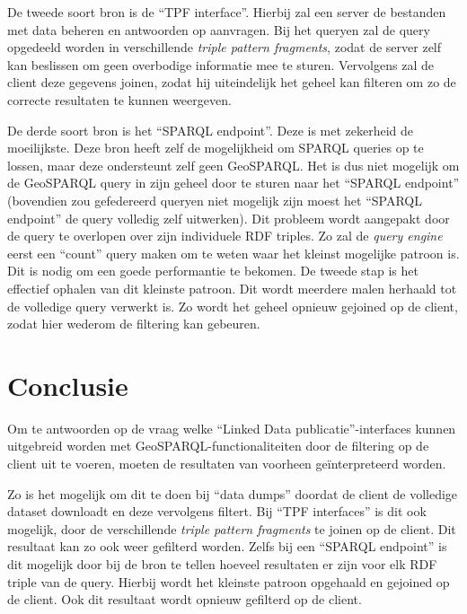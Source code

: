 \documentclass[twocolumn]{phdsymp} %
\begin{document}
De tweede soort bron is de ``TPF interface''. Hierbij zal een server de bestanden met data beheren en antwoorden op aanvragen. Bij het queryen zal de query opgedeeld worden in verschillende \textit{triple pattern fragments}, zodat de server zelf kan beslissen om geen overbodige informatie mee te sturen. Vervolgens zal de client deze gegevens joinen, zodat hij uiteindelijk het geheel kan filteren om zo de correcte resultaten te kunnen weergeven.

De derde soort bron is het ``SPARQL endpoint''. Deze is met zekerheid de moeilijkste. Deze bron heeft zelf de mogelijkheid om SPARQL queries op te lossen, maar deze ondersteunt zelf geen GeoSPARQL. Het is dus niet mogelijk om de GeoSPARQL query in zijn geheel door te sturen naar het ``SPARQL endpoint'' (bovendien zou gefedereerd queryen niet mogelijk zijn moest het ``SPARQL endpoint'' de query volledig zelf uitwerken). Dit probleem wordt aangepakt door de query te overlopen over zijn individuele RDF triples. Zo zal de \textit{query engine} eerst een ``count'' query maken om te weten waar het kleinst mogelijke patroon is. Dit is nodig om een goede performantie te bekomen. De tweede stap is het effectief ophalen van dit kleinste patroon. Dit wordt meerdere malen herhaald tot de volledige query verwerkt is. Zo wordt het geheel opnieuw gejoined op de client, zodat hier wederom de filtering kan gebeuren.

\section{Conclusie}
Om te antwoorden op de vraag welke ``Linked Data publicatie''-interfaces kunnen uitgebreid worden met GeoSPARQL-functionaliteiten door de filtering op de client uit te voeren, moeten de resultaten van voorheen geïnterpreteerd worden. 

Zo is het mogelijk om dit te doen bij ``data dumps'' doordat de client de volledige dataset downloadt en deze vervolgens filtert. Bij ``TPF interfaces'' is dit ook mogelijk, door de verschillende \textit{triple pattern fragments} te joinen op de client. Dit resultaat kan zo ook weer gefilterd worden. Zelfs bij een ``SPARQL endpoint'' is dit mogelijk door bij de bron te tellen hoeveel resultaten er zijn voor elk RDF triple van de query. Hierbij wordt het kleinste patroon opgehaald en gejoined op de client. Ook dit resultaat wordt opnieuw gefilterd op de client. 



\end{document}
